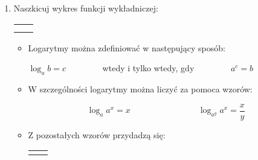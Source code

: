 \documentclass[12pt,a4paper]{article}
\begin{document}
\begin{enumerate}[1.]
\begin{enumerate}[a)]
\begin{tabular}{p{7cm} p{7cm}}
		\end{tabular} \end{enumerate}
	
	\item Naszkicuj wykres funkcji wykładniczej:
	
		\begin{enumerate}[a)] \begin{tabular}{p{7cm} p{7cm}}
			\item $f(x)=2^x$& \vspace{0.4cm}\item $g(x)=3^{-x}$ \\
			\item $h(x)=2^{x+3}-2$& \item$i(x)=\frac{1}{2}^{x-2}+1$ \\
	\end{tabular} \end{enumerate}
	
	
	\newpage
	\begin{itemize}
		\item Logarytmy można zdefiniować w następujący sposób:
	
	\begin{mdframed}[%
		linecolor=cyan,%
		linewidth=2pt,%
		innertopmargin=\topskip,%
		innertopmargin=10,%
		innerbottommargin=10,%
		leftmargin=10,%
		rightmargin=10,%
		]
	\centering	$\log_ab = c\qquad\qquad$ wtedy i tylko wtedy, gdy $\qquad\qquad a^c=b$
		
		
	\end{mdframed}

	\item W szczególności logarytmy można liczyć za pomoca wzorów:
	
	\begin{mdframed}[%
		linecolor=cyan,%
		linewidth=2pt,%
		innertopmargin=\topskip,%
		innertopmargin=0,%
		innerbottommargin=10,%
		leftmargin=10,%
		rightmargin=10,%
		]
		\centering	$$\log_aa^x=x \qquad\qquad\qquad\qquad\log_{a^y}a^x=\frac{x}{y}$$
		
	\end{mdframed}

	\item Z pozostałych wzorów przydadzą się:
	
	\begin{mdframed}[%
		linecolor=cyan,%
		linewidth=2pt,%
		innertopmargin=\topskip,%
		innertopmargin=0,%
		innerbottommargin=10,%
		leftmargin=10,%
		rightmargin=10,%
		]
		 \begin{tabular}{p{7cm} p{7cm}}
			\centering\item $\log_ax+\log_ay=\log_ax\cdot y$& \item $\log_ax-\log_ay=\log_a\frac{x}{y}$ \\
			

\end{tabular}
\end{mdframed}
\end{itemize}
\end{enumerate}
\end{document}
